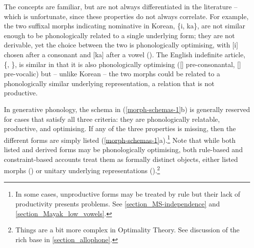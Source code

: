  The concepts are familiar, but are not always differentiated in the literature -- which is unfortunate, since these properties do not always correlate. For example, the two suffixal morphs indicating nominative in Korean, \{i, ka\}, are not similar enough to be phonologically related to a single underlying form; they are not derivable, yet the choice between the two is phonologically optimising, with [i] chosen after a consonant and [ka] after a vowel (\citealt{Sung:2005}). The English indefinite article, \{\@, \@n\}, is similar in that it is also phonologically optimising ([\@] pre-consonantal, [\@n] pre-vocalic) but -- unlike Korean -- the two morphs could be related to a phonologically similar underlying representation, a relation that is not productive.


 
In generative phonology, the schema in (\ref{morph-schemas-1}b) is generally reserved for cases that satisfy all three criteria: they are phonologically relatable,  productive, and optimising. If any of the three properties is missing, then the different forms are simply listed (\ref{morph-schemas-1}a).\footnote{In some cases, unproductive forms may be treated by rule but their lack of productivity presents problems. See \textsection\ref{section_MS-independence} and \textsection\ref{section_Mayak_low_vowels}.}   Note that while both listed and derived forms may be phonologically optimising, both rule-based and constraint-based accounts treat them as formally distinct objects, either listed morphs (\citealt{Mascaro:2007, Nevins:2011}) or unitary underlying representations (\citealt{Chomsky+:1968, Prince+:1993}).\footnote{Things are a bit more complex in Optimality Theory. See discussion  of the rich base in \Sec\ref{section_allophone}.} 

